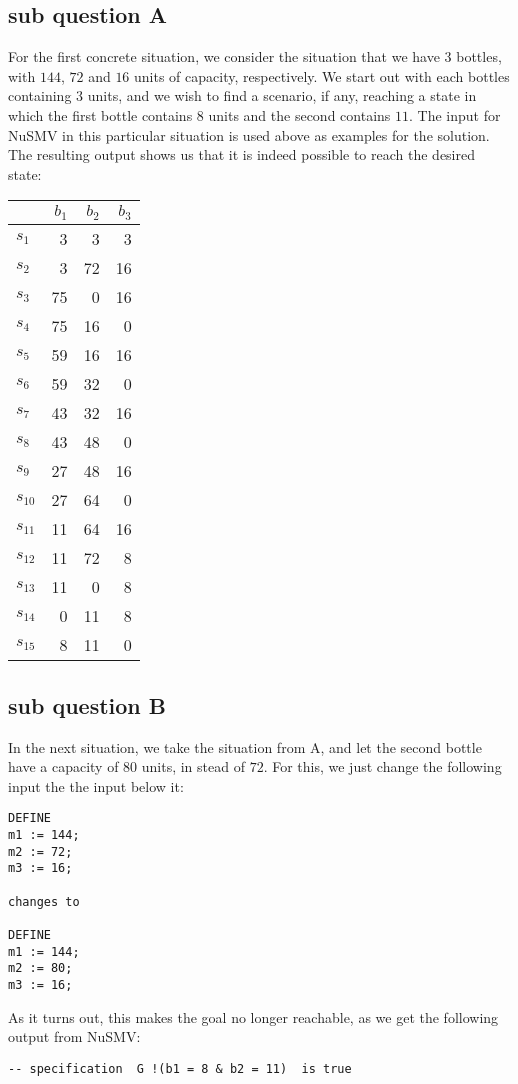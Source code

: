 \subsection{sub question A}
For the first concrete situation, we consider the situation that we have $3$ bottles, with $144$, $72$ and $16$ units of capacity, respectively. We start out with each bottles containing $3$ units, and we wish to find a scenario, if any, reaching a state in which the first bottle contains $8$ units and the second contains $11$. The input for NuSMV in this particular situation is used above as examples for the solution. The resulting output shows us that it is indeed possible to reach the desired state:\\
\begin{tabular}{ l | r  r  r }
   & $b_1$ & $b_2$ & $b_3$  \\
  \hline			
  $s_1$ & 3 & 3 & 3 \\ 
  $s_2$ & 3 & 72 & 16 \\ 
  $s_3$ & 75 & 0 & 16 \\ 
  $s_4$ & 75 & 16 & 0 \\ 
  $s_5$ & 59 & 16 & 16 \\ 
  $s_6$ & 59 & 32 & 0 \\ 
  $s_7$ & 43 & 32 & 16 \\ 
  $s_8$ & 43 & 48 & 0 \\ 
  $s_9$ & 27 & 48 & 16 \\ 
  $s_{10}$ & 27 & 64 & 0 \\ 
  $s_{11}$ & 11 & 64 & 16 \\ 
  $s_{12}$ & 11 & 72 & 8 \\ 
  $s_{13}$ & 11 & 0 & 8 \\ 
  $s_{14}$ & 0 & 11 & 8 \\ 
  $s_{15}$ & 8 & 11 & 0 \\ 
\end{tabular}

\subsection{sub question B}
In the next situation, we take the situation from A, and let the second bottle have a capacity of $80$ units, in stead of $72$. For this, we just change the following input the the input below it:
\begin{verbatim}
DEFINE
m1 := 144;
m2 := 72;
m3 := 16;

changes to

DEFINE
m1 := 144;
m2 := 80;
m3 := 16;
\end{verbatim}
As it turns out, this makes the goal no longer reachable, as we get the following output from NuSMV:\\
\begin{verbatim}
-- specification  G !(b1 = 8 & b2 = 11)  is true
\end{verbatim}

